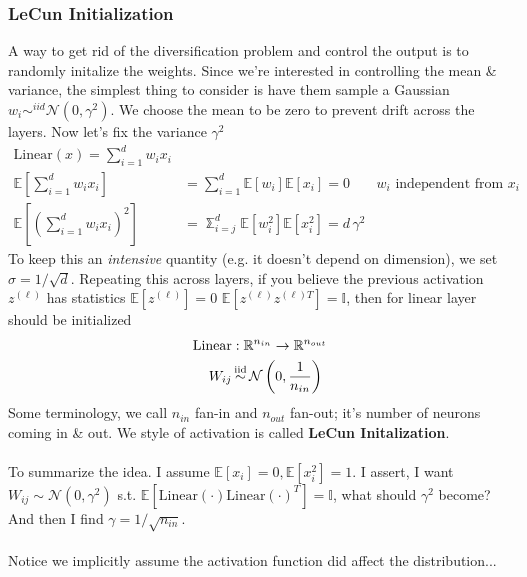 \subsubsection{LeCun Initialization }
A way to get rid of the diversification problem and control the output is to randomly initalize the weights. Since we're interested in controlling the mean \& variance, the simplest thing to consider is have them sample a Gaussian $w_i \sim^{iid} \mathcal N(0, \gamma^2)$. We choose the mean to be zero to prevent drift across the layers. Now let's fix the variance $\gamma^2$
\begin{align}
	\text{Linear}(x)  = \sum_{i=1}^d w_i x_i & \\
	\mathbb E \left[ \sum_{i=1}^d w_i x_i  \right] & = \sum_{i=1}^d \mathbb E[w_i] \mathbb E[x_i] =  0 & w_i \text{ independent from } x_i\\
	\mathbb E \left[ \left(\sum_{i=1}^d w_i x_i \right)^2  \right] & = \mathbb \sum_{i=j}^d \mathbb E[w_i^2] \mathbb E[x_i^2] = d \, \gamma^2
\end{align}
To keep this an \emph{intensive} quantity (e.g. it doesn't depend on dimension), we set $\sigma = 1/\sqrt{d}$. Repeating this across layers, if you believe the previous activation $z^{(\ell)}$ has statistics $\mathbb E[z^{(\ell)}] = 0$ $\mathbb E[z^{(\ell)} z^{(\ell)T}] = \mathbb I$, then for linear layer should be initialized 
\begin{align}
	\text{Linear}& : \mathbb R^{n_{in}} \to \mathbb R^{n_{out}}\\
	W_{ij} & \operatorname{\stackrel{\mathrm{iid}}{\sim}} \mathcal N\left(0, \frac{1}{n_{in}}\right)
\end{align}
Some terminology, we call $n_{in}$ fan-in and $n_{out}$ fan-out; it's number of neurons coming in \& out. We style of activation is called \textbf{LeCun Initalization}. 
\\
\\
To summarize the idea. I assume $\mathbb E[x_i]=0, \mathbb E[x_i^2] = 1$. I assert, I want $W_{ij} \sim \mathcal N(0, \gamma^2)$ s.t. $\mathbb E[\text{Linear}(\cdot) \text{Linear}(\cdot)^T] = \mathbb I$, what should $\gamma^2$ become? And then I find $\gamma = 1/\sqrt{n_{in}}$.\\
\\
Notice we implicitly assume the activation function did affect the distribution...

